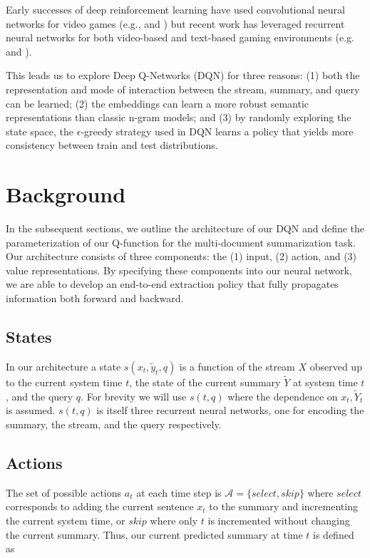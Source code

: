 \documentclass[12pt]{article}
\begin{document}
Early successes of deep reinforcement learning have used convolutional neural networks for video games (e.g., \cite{MnihBMGLHSK16} and \cite{MnihKSGAWR13}) but recent work has leveraged recurrent neural networks for both video-based and text-based gaming environments (e.g. \cite{hausknecht2015deep} and \cite{narasimhan2015language}). 

This leads us to explore Deep Q-Networks (DQN) for three reasons: (1) both the representation and mode of interaction between the stream, summary, and 
query can be learned; (2) the embeddings can learn a more robust semantic representations than classic n-gram models; and (3) by randomly exploring the state space, the $\epsilon$-greedy strategy used in DQN learns a policy that yields more consistency between train and test distributions.

\section{Background}

In the subsequent sections, we outline the architecture of our DQN and define the parameterization of our Q-function for the multi-document summarization task. Our architecture consists of three components: the (1) input, (2) action, and (3) value representations. By specifying these components into our neural network, we are able to develop an end-to-end extraction policy that fully propagates information both forward and backward.
  

\subsection{States}  

In our architecture a state $s(x_{t},\tilde{y}_{t}, q)$ is a function of the stream $X$ observed up to the current system time $t$, the state of the current summary $\tilde{Y}$ at system time $t$, and the query $q$. For brevity we will use $s(t,q)$ where the dependence on $x_{t},\tilde{Y}_{t}$ is assumed. $s(t,q)$ is itself three recurrent neural networks, one for encoding  the summary, the stream, and the query respectively. 

\subsection{Actions} 
The set of possible actions $a_t$ at each time step is $\mathcal{A} = \{select, skip\}$ where $select$ corresponds to adding the current sentence $x_t$ to the summary and incrementing the current system time, or $skip$ where only $t$ is incremented without changing the current summary. Thus, our current predicted summary at time $t$ is defined as
\end{document}
